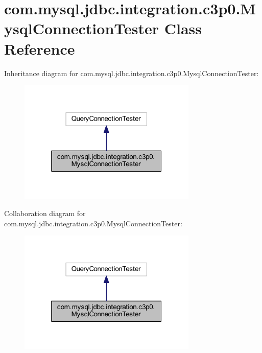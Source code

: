 \hypertarget{classcom_1_1mysql_1_1jdbc_1_1integration_1_1c3p0_1_1_mysql_connection_tester}{}\section{com.\+mysql.\+jdbc.\+integration.\+c3p0.\+Mysql\+Connection\+Tester Class Reference}
\label{classcom_1_1mysql_1_1jdbc_1_1integration_1_1c3p0_1_1_mysql_connection_tester}


Inheritance diagram for com.\+mysql.\+jdbc.\+integration.\+c3p0.\+Mysql\+Connection\+Tester\+:
\nopagebreak
\begin{figure}[H]
\begin{center}
\leavevmode
\includegraphics[width=241pt]{classcom_1_1mysql_1_1jdbc_1_1integration_1_1c3p0_1_1_mysql_connection_tester__inherit__graph}
\end{center}
\end{figure}


Collaboration diagram for com.\+mysql.\+jdbc.\+integration.\+c3p0.\+Mysql\+Connection\+Tester\+:
\nopagebreak
\begin{figure}[H]
\begin{center}
\leavevmode
\includegraphics[width=241pt]{classcom_1_1mysql_1_1jdbc_1_1integration_1_1c3p0_1_1_mysql_connection_tester__coll__graph}
\end{center}
\end{figure}
